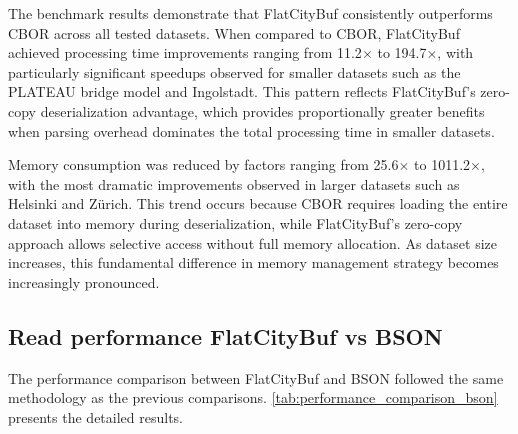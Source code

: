 The benchmark results demonstrate that FlatCityBuf consistently outperforms CBOR across all tested datasets. When compared to CBOR, FlatCityBuf achieved processing time improvements ranging from 11.2$\times$ to 194.7$\times$, with particularly significant speedups observed for smaller datasets such as the PLATEAU bridge model and Ingolstadt. This pattern reflects FlatCityBuf's zero-copy deserialization advantage, which provides proportionally greater benefits when parsing overhead dominates the total processing time in smaller datasets.

Memory consumption was reduced by factors ranging from 25.6$\times$ to 1011.2$\times$, with the most dramatic improvements observed in larger datasets such as Helsinki and Zürich. This trend occurs because CBOR requires loading the entire dataset into memory during deserialization, while FlatCityBuf's zero-copy approach allows selective access without full memory allocation. As dataset size increases, this fundamental difference in memory management strategy becomes increasingly pronounced.

\subsection{Read performance FlatCityBuf vs BSON}
\label{result:benchmark_on_local_environment:read_performance_flatcitybuf_vs_bson}

The performance comparison between FlatCityBuf and BSON followed the same methodology as the previous comparisons. \autoref{tab:performance_comparison_bson} presents the detailed results.

